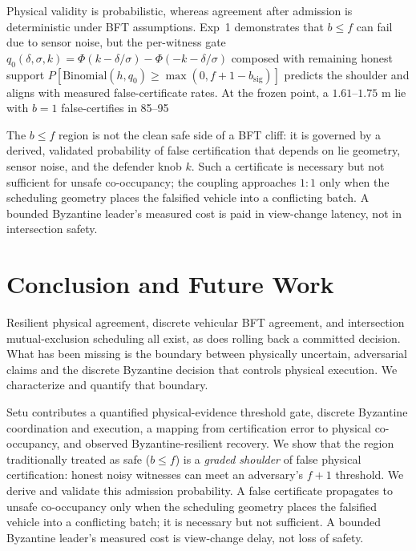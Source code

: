 \documentclass[letterpaper,10pt,conference]{IEEEtran}
\begin{document}
Physical validity is probabilistic, whereas agreement after admission is deterministic under BFT assumptions. Exp~1 demonstrates that $b\le f$ can fail due to sensor noise, but the per-witness gate $q_0(\delta,\sigma,k)=\Phi(k-\delta/\sigma)-\Phi(-k-\delta/\sigma)$ composed with remaining honest support $P[\mathrm{Binomial}(h,q_0)\ge \max(0,f{+}1-b_{\mathrm{sig}})]$
predicts the shoulder and aligns with measured false-certificate rates. At the frozen point, a $1.61$–$1.75$ m lie with $b=1$ false-certifies in 85–95%




The $b \le f$ region is not the clean safe side of a BFT cliff: it is governed by a derived, validated probability of false certification that depends on lie geometry, sensor noise, and the defender knob  $k$. Such a certificate is necessary but not sufficient for unsafe co-occupancy; the coupling approaches $1:1$ only when the scheduling geometry places the falsified vehicle into a conflicting batch. A bounded Byzantine leader's measured cost is paid in view-change latency, not in intersection safety.






\section{Conclusion and Future Work}
\label{sec:conclusion}


Resilient physical agreement, discrete vehicular BFT agreement, and
intersection mutual-exclusion scheduling all exist, as does rolling back
a committed decision. What has been missing is the boundary between
physically uncertain, adversarial claims and the discrete Byzantine
decision that controls physical execution. We characterize and quantify
that boundary.

Setu contributes a quantified physical-evidence threshold gate, discrete
Byzantine coordination and execution, a mapping from certification error
to physical co-occupancy, and observed Byzantine-resilient recovery. We
show that the region traditionally treated as safe ($b \le f$) is a
\emph{graded shoulder} of false physical certification: honest noisy
witnesses can meet an adversary's $f{+}1$ threshold. We derive and
validate this admission probability. A false certificate propagates to
unsafe co-occupancy only when the scheduling geometry places the
falsified vehicle into a conflicting batch; it is necessary but not
sufficient. A bounded Byzantine leader's measured cost is view-change
delay, not loss of safety.
\end{document}
